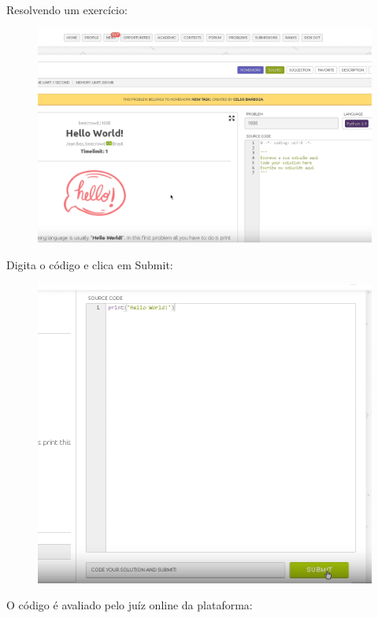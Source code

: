 \begin{enumerate}
    Resolvendo um exercício:

    \begin{figure}[H]
        \centering
            \includegraphics[scale=0.375]{pictures/apendices/apendice_b_20.png}
    \end{figure}

    Digita o código e clica em Submit:

    \begin{figure}[H]
        \centering
            \includegraphics[scale=0.425]{pictures/apendices/apendice_b_22.png}
    \end{figure}

    O código é avaliado pelo juíz online da plataforma:


\end{enumerate}
